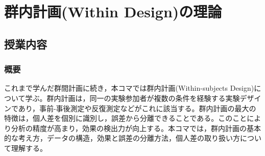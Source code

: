 \section{群内計画(Within Design)の理論}
\label{b21_WithinDesign} 
\subsection{授業内容}
\subsubsection{概要}
これまで学んだ群間計画に続き，本コマでは群内計画(Within-subjects Design)について学ぶ。群内計画は，同一の実験参加者が複数の条件を経験する実験デザインであり，事前-事後測定や反復測定などがこれに該当する。群内計画の最大の特徴は，個人差を個別に識別し，誤差から分離できることである。このことにより分析の精度が高まり，効果の検出力が向上する。本コマでは，群内計画の基本的な考え方，データの構造，効果と誤差の分離方法，個人差の取り扱い方について理解する。

